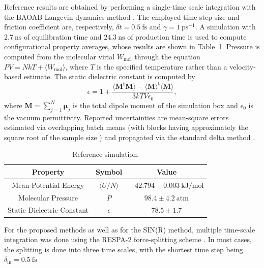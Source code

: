 \documentclass[
aip,
jcp,
reprint,
]{revtex4-1}
\newcommand{\vt}[1]{\boldsymbol{\mathbf{#1}}}          %
\newcommand{\tr}[1]{#1^\text{t}}                       %
\begin{document}
Reference results are obtained by performing a single-time scale integration with the BAOAB Langevin dynamics method \cite{Leimkuhler_2012a, Leimkuhler_2013b}.
The employed time step size and friction coefficient are, respectively, $\delta t = 0.5~\mathrm{fs}$ and $\gamma = 1~\mathrm{ps}^{-1}$.
A simulation with $2.7~\mathrm{ns}$ of equilibration time and $24.3~\mathrm{ns}$ of production time is used to compute configurational property averages, whose results are shown in Table~\ref{tab:reference water simulation}.
Pressure is computed from the molecular virial \cite{Tuckerman_2010} $W_\mathrm{mol}$ through the equation $P V = N k T + \langle W_\mathrm{mol} \rangle$, where $T$ is the specified temperature rather than a velocity-based estimate.
The static dielectric constant is computed by
\begin{equation*}
\epsilon = 1 + \frac{\langle \tr{\vt M} \vt M\rangle - \tr{\langle\vt M\rangle} \langle\vt M\rangle}{3 k T V \epsilon_0},
\end{equation*}
where $\vt M = \sum_{j=1}^N {\vt \mu}_j$ is the total dipole moment of the simulation box and $\epsilon_0$ is the vacuum permittivity.
Reported uncertainties are mean-square errors estimated via overlapping batch means \cite{Meketon_1984} (with blocks having approximately the square root of the sample size \cite{Flegal_2010}) and propagated via the standard delta method \cite{Greene_2012}.

\begin{table}[htbp!]
	\centering
	\caption{
		Reference simulation.
	}
	\label{tab:reference water simulation}
	\begin{ruledtabular}
		\begin{tabular}{ccc}
			         Property          &        Symbol         &                 Value                 \\ \hline
			  Mean Potential Energy    & $\langle U/N \rangle$ & $-42.794 \pm 0.003 ~ \mathrm{kJ/mol}$ \\
			    Molecular Pressure     &          $P$          &     $98.4 \pm 4.2 ~ \mathrm{atm}$     \\
			Static Dielectric Constant &      $\epsilon$       &            $78.5 \pm 1.7$
		\end{tabular}
	\end{ruledtabular}
\end{table}

For the proposed methods as well as for the SIN(R) method, multiple time-scale integration was done using the RESPA-2 force-splitting scheme \cite{Zhou_2001, Morrone_2010, Leimkuhler_2013}.
In most cases, the splitting is done into three time scales, with the shortest time step being $\delta_\mathrm{in} = 0.5~\mathrm{fs}$
\end{document}
